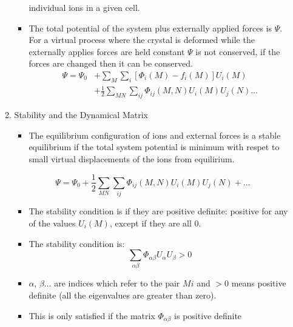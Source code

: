 \documentclass[11pt]{article}
\begin{document}
\begin{enumerate}
\begin{enumerate}
\begin{itemize}
individual ions in a given cell.
\item The total potential of the system plus externally applied forces is
\(\Psi\). For a virtual process where the crystal is deformed while the
externally applies forces are held constant \(\Psi\) is not conserved, if
the forces are changed then it can be conserved. 
\begin{align}
\Psi = \Psi_{0} &+ \sum_{M}\sum_{i}[\Phi_{i}(M) - f_i(M)]U_{i}(M)\\
     &+ \frac{1}{2}\sum_{MN}\sum_{ij}\Phi_{ij}(M,N)U_i(M)U_j(N) \dots
\end{align}
\end{itemize}
\item Stability and the Dynamical Matrix
\label{sec:orged3228b}
\begin{itemize}
\item The equilibrium configuration of ions and external forces is a stable
equilibrium if the total system potential is minimum with respet to
small virtual displacements of the ions from equilirium.
\end{itemize}
\[\Psi = \Psi_{0}+
     \frac{1}{2}\sum_{MN}\sum_{ij}\Phi_{ij}(M,N)U_i(M)U_j(N) + \dots \]
\begin{itemize}
\item The stability condition is if they are positive definite: positive for
any of the values \(U_{i}(M)\), except if they are all 0.
\item The stability condition is:
\[ \sum_{\alpha \beta} \Phi_{\alpha\beta}U_{\alpha}U_{\beta} > 0 \]
\item \(\alpha\), \(\beta \dots\) are indices which refer to the pair  \(Mi\) and
\(>0\) means positive definite (all the eigenvalues are greater than zero).
\item This is only satisfied if the matrix \(\Phi_{\alpha\beta}\) is positive definite
\end{itemize}
\end{enumerate}
\end{enumerate}
\end{document}
